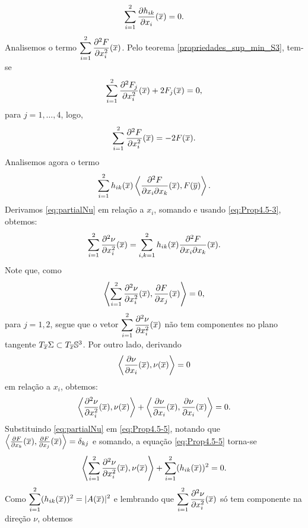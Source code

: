 \begin{demonstracao}
\begin{eqnarray}\label{eq:Prop4.5-3}
\sum_{i=1}^2\frac{\partial h_{ik}}{\partial x_i}(\overline{x}) = 0.
\end{eqnarray}
Analisemos o termo 
$\displaystyle\sum_{i=1}^2 \frac{\partial^2 F}{\partial x_i^2}(\overline{x})$. 
Pelo teorema \ref{propriedades_sup_min_S3}, tem-se
\begin{equation*}
\sum_{i=1}^2 \frac{\partial^2 F_j}{\partial x_i^2}(\overline{x}) + 2F_j(\overline{x}) = 0,
\end{equation*}
para $j=1,\ldots,4$, logo,
\[
\sum_{i=1}^2 \frac{\partial^2 F}{\partial x_i^2}(\overline{x}) = -2 F(\overline{x}).
\]
Analisemos agora o termo 
\[
\sum_{i=1}^2 h_{ik}(\overline{x}) \left\langle \frac{\partial^2 F}
{\partial x_i \partial x_k}(\overline{x}), F(\overline{y}) \right\rangle.
\]
Derivamos \eqref{eq:partialNu} em rela\c c\~ao a $x_i$, somando
e usando \eqref{eq:Prop4.5-3}, obtemos:
\begin{eqnarray}\label{eq:Prop4.5-4}
\sum_{i=1}^2 \frac{\partial^2 \nu}{\partial x_i^2}(\overline{x}) = 
\sum_{i,k=1}^2 h_{ik}(\overline{x})\frac{\partial^2 F}{\partial x_i \partial x_k}(\overline{x}).
\end{eqnarray}
Note que, como
\[
\left\langle \sum_{i=1}^2 \frac{\partial^2 \nu}{\partial x_i^2}(\overline{x}), 
\frac{\partial F}{\partial x_j}(\overline{x}) \right\rangle = 0,
\]
para $j=1,2$, segue que o vetor
$\displaystyle\sum_{i=1}^2 \frac{\partial^2 \nu}{\partial x_i^2}(\overline{x})$ 
não tem componentes no plano tangente 
$T_{\overline{x}}\Sigma\subset T_{\overline{x}}\mathbb{S}^3$. 
Por outro lado, derivando
\[
\left\langle \frac{\partial \nu}{\partial x_i}(\overline{x}), \nu(\overline{x}) \right\rangle = 0
\]
em rela\c c\~ao a $x_i$, obtemos:
\begin{equation}\label{eq:Prop4.5-5}
\left\langle \frac{\partial^2 \nu}{\partial x_i^2}(\overline{x}), \nu(\overline{x})\right\rangle 
+ \left\langle \frac{\partial \nu}{\partial x_i}(\overline{x}), 
\frac{\partial \nu}{\partial x_i}(\overline{x}) \right\rangle = 0.
\end{equation}	
Substituindo \eqref{eq:partialNu} em \eqref{eq:Prop4.5-5}, notando que
$\left\langle \frac{\partial F}{\partial x_k}(\overline{x}), 
\frac{\partial F}{\partial x_j}(\overline{x}) \right\rangle = \delta_{kj}$ e somando,
a equa\c c\~ao \eqref{eq:Prop4.5-5} torna-se
\begin{equation*}
\left\langle \sum_{i=1}^2 \frac{\partial^2 \nu}{\partial x_i^2}(\overline{x}), \nu(\overline{x})
\right\rangle + \sum_{i=1}^2 (h_{ik}(\overline{x}))^2 = 0.
\end{equation*}	
Como $\displaystyle\sum_{i=1}^2 (h_{ik}(\overline{x}))^2 = |A(\overline{x})|^2$ e
lembrando que 
$\displaystyle\sum_{i=1}^2 \frac{\partial^2 \nu}{\partial x_i^2}(\overline{x})$ 
só tem componente na direção $\nu$, obtemos

\end{demonstracao}
